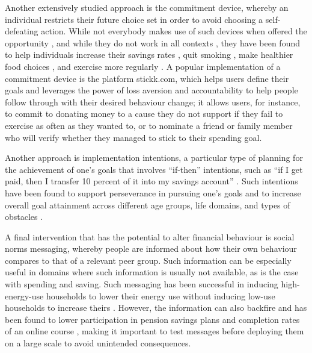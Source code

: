 Another extensively studied approach is the commitment device, whereby an
individual restricts their future choice set in order to avoid choosing a
self-defeating action. While not everybody makes use of such devices when
offered the opportunity \citep{bryan2010commitment}, and while they do not work
in all contexts \citep{laibson2015don,robinson2018some}, they have been found
to help individuals increase their savings rates \citep{ashraf2006tying}, quit
smoking \citep{gine2010put}, make healthier food choices
\citep{schwartz2014healthier}, and exercise more regularly
\citep{royer2015incentives}. A popular implementation of a commitment device is
the platform stickk.com, which helps users
define their goals and leverages the power of loss aversion and accountability
to help people follow through with their desired behaviour change; it allows
users, for instance, to commit to donating money to a cause they do not support
if they fail to exercise as often as they wanted to, or to nominate a friend or
family member who will verify whether they managed to stick to their spending
goal.

Another approach is implementation intentions, a particular type of planning
for the achievement of one's goals that involves ``if-then'' intentions, such as
``if I get paid, then I transfer 10 percent of it into my savings account''
\citep{gollwitzer2006implementation, rogers2015beyond}. Such intentions have
been found to support perseverance in pursuing one's goals
\citep{oettingen2010strategies} and to increase overall goal attainment across
different age groups, life domains, and types of obstacles
\citep{gollwitzer2006implementation}.

A final intervention that has the potential to alter financial behaviour is
social norms messaging, whereby people are informed about how their own
behaviour compares to that of a relevant peer group. Such information can be
especially useful in domains where such information is usually not available,
as is the case with spending and saving. Such messaging has been successful in inducing high-energy-use households to lower their energy use without inducing low-use
households to increase theirs \citep{schultz2007constructive,
allcott2011social, allcott2014short, brandon2017effects}. However, the
information can also backfire and has been found to lower participation in
pension savings plans \citep{beshears2015effect} and completion rates of an
online course \citep{rogers2016discouraged}, making it important to test
messages before deploying them on a large scale to avoid unintended
consequences.

